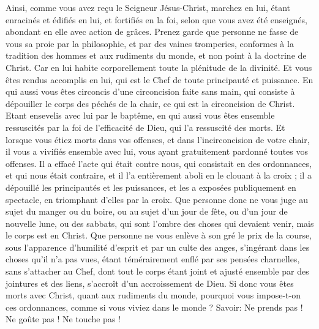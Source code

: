 \begin{multicols}{2}
Ainsi, comme vous avez reçu le Seigneur Jésus-Christ, marchez en lui,
étant enracinés et édifiés en lui, et fortifiés en la foi, selon que vous avez été enseignés, abondant en elle avec action de grâces.
Prenez garde que personne ne fasse de vous sa proie par la philosophie, et par des vaines tromperies, conformes à la tradition des hommes et aux rudiments du monde, et non point à la doctrine de Christ.
Car en lui habite corporellement toute la plénitude de la divinité.
Et vous êtes rendus accomplis en lui, qui est le Chef de toute principauté et puissance.
En qui aussi vous êtes circoncis d'une circoncision faite sans main, qui consiste à dépouiller le corps des péchés de la chair, ce qui est la circoncision de Christ.
Etant ensevelis avec lui par le baptême, en qui aussi vous êtes ensemble ressuscités par la foi de l'efficacité de Dieu, qui l'a ressuscité des morts.
Et lorsque vous étiez morts dans vos offenses, et dans l'incirconcision de votre chair, il vous a vivifiés ensemble avec lui, vous ayant gratuitement pardonné toutes vos offenses.
Il a effacé l'acte qui était contre nous, qui consistait en des ordonnances, et qui nous était contraire, et il l'a entièrement aboli en le clouant à la croix ;
il a dépouillé les principautés et les puissances, et les a exposées publiquement en spectacle, en triomphant d'elles par la croix.
Que personne donc ne vous juge au sujet du manger ou du boire, ou au sujet d'un jour de fête, ou d'un jour de nouvelle lune, ou des sabbats,
qui sont l'ombre des choses qui devaient venir, mais le corps est en Christ.
Que personne ne vous enlève à son gré le prix de la course, sous l'apparence d'humilité d'esprit et par un culte des anges, s'ingérant dans les choses qu'il n'a pas vues, étant témérairement enflé par ses pensées charnelles,
sans s'attacher au Chef, dont tout le corps étant joint et ajusté ensemble par des jointures et des liens, s'accroît d'un accroissement de Dieu.
Si donc vous êtes morts avec Christ, quant aux rudiments du monde, pourquoi vous impose-t-on ces ordonnances, comme si vous viviez dans le monde ?
Savoir: Ne prends pas ! Ne goûte pas ! Ne touche pas !

\end{multicols}
